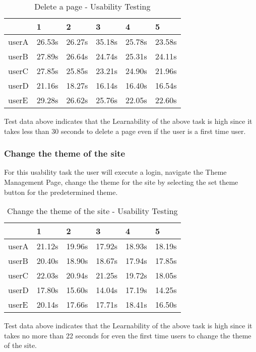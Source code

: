 \documentclass[12pt]{article}
\begin{document}
\begin{table}[H]
\centering
\caption{Delete a page - Usability Testing}
\begin{tabular}{|l|l|l|l|l|l|}
\hline
      & 1      & 2      & 3      & 4      & 5      \\ \hline
userA & 26.53s & 26.27s & 35.18s & 25.78s  & 23.58s \\ \hline
userB & 27.89s & 26.64s & 24.74s & 25.31s & 24.11s \\ \hline
userC & 27.85s & 25.85s & 23.21s & 24.90s & 21.96s \\ \hline
userD & 21.16s & 18.27s & 16.14s & 16.40s & 16.54s \\ \hline
userE & 29.28s & 26.62s & 25.76s & 22.05s & 22.60s \\ \hline
\end{tabular}
\end{table}

Test data above indicates that the Learnability of the above task is high since it takes less than 30 seconds to delete a page even if the user is a first time user. 

\subsubsection{Change the theme of the site}
For this usability task the user will execute a login, navigate the Theme Management Page, change the theme for the site by selecting the set theme button for the predetermined theme.

\begin{table}[H]
\centering
\caption{Change the theme of the site - Usability Testing}
\begin{tabular}{|l|l|l|l|l|l|}
\hline
      & 1      & 2      & 3      & 4      & 5      \\ \hline
userA & 21.12s & 19.96s & 17.92s & 18.93s & 18.19s \\ \hline
userB & 20.40s & 18.90s & 18.67s & 17.94s & 17.85s \\ \hline
userC & 22.03s & 20.94s & 21.25s & 19.72s & 18.05s \\ \hline
userD & 17.80s & 15.60s & 14.04s & 17.19s & 14.25s \\ \hline
userE & 20.14s & 17.66s & 17.71s & 18.41s & 16.50s \\ \hline
\end{tabular}
\end{table}

Test data above indicates that the Learnability of the above task is high since it takes no more than 22 seconds for even the first time users to change the theme of the site. 
\end{document}
